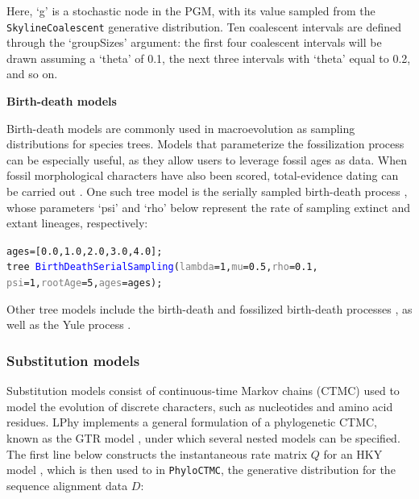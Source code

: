 \documentclass[10pt,letterpaper,table]{article}
\theoremstyle{definition}
\begin{document}
Here, `g' is a stochastic node in the PGM, with its value sampled from the \texttt{SkylineCoalescent} generative distribution. Ten coalescent intervals are defined through the `groupSizes' argument: the first four coalescent intervals will be drawn assuming a `theta' of 0.1, the next three intervals with `theta' equal to 0.2, and so on.
\newline

\textbf{Birth-death models}

Birth-death models are commonly used in macroevolution as sampling distributions for species trees. 
Models that parameterize the fossilization process can be especially useful, as they allow users to leverage fossil ages as data. 
When fossil morphological characters have also been scored, total-evidence dating can be carried out \cite{ogilvie21}. 
One such tree model is the serially sampled birth-death process \cite{stadler2013dating}, whose parameters `psi' and `rho' below represent the rate of sampling extinct and extant lineages, respectively:

{\small
  \begin{alltt}
    ages = [\textcolor{constant}{0.0}, \textcolor{constant}{1.0}, \textcolor{constant}{2.0}, \textcolor{constant}{3.0}, \textcolor{constant}{4.0}];
    \textcolor{bluishgreen}{tree} ~ \textcolor{blue}{BirthDeathSerialSampling}(\textcolor{gray}{lambda}=1, \textcolor{gray}{mu}=\textcolor{constant}{0.5}, \textcolor{gray}{rho}=\textcolor{constant}{0.1},
    \textcolor{gray}{psi}=\textcolor{constant}{1}, \textcolor{gray}{rootAge}=\textcolor{constant}{5}, \textcolor{gray}{ages}=ages);
  \end{alltt}
}

Other tree models include the birth-death \cite{kendall1948generalized} and fossilized birth-death processes \cite{heath2014fossilized}, as well as the Yule process \cite{yule1925ii}. 

\subsubsection{Substitution models}
Substitution models consist of continuous-time Markov chains (CTMC) used to model the evolution of discrete characters, such as nucleotides and amino acid residues. 
LPhy implements a general formulation of a phylogenetic CTMC, known as the GTR model \cite{gtr}, under which several nested models can be specified. 
The first line below constructs the instantaneous rate matrix $Q$ for an HKY model \cite{hasegawa1985dating}, which is then used to in \texttt{PhyloCTMC}, the generative distribution for the sequence alignment data $D$:
\end{document}
